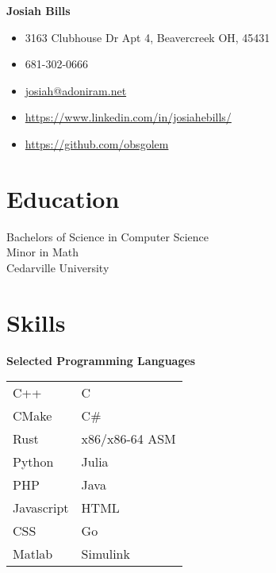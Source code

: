 \documentclass[10pt]{article}
\begin{document}
\begin{paracol}{2}
    \parbox[top][0.08\textheight][c]{\linewidth}{
        \textbf{\Huge{Josiah Bills}}
    }

    \switchcolumn

    \parbox[top][0.08\textheight][c]{\linewidth}{
        \begin{mdframed}[hidealllines=true,backgroundcolor=gray!20]
            \begin{itemize}[noitemsep]
                \item[] 3163 Clubhouse Dr Apt 4, Beavercreek OH, 45431
                \item[] 681-302-0666
                \item[] \href{mailto://Josiah@adoniram.net}{josiah@adoniram.net}
                \item[] \url{https://www.linkedin.com/in/josiahebills/}
                \item[] \url{https://github.com/obsgolem}
            \end{itemize}
        \end{mdframed}
    }

    \switchcolumn

    \section*{Education}
    \parbox[top][][c]{\linewidth}{
        Bachelors of Science in Computer Science \\
        Minor in Math \\
        Cedarville University
    }

    \section*{Skills}

    \parbox[top][][c]{\linewidth}{
        \begin{center}
            \textbf{Selected Programming Languages}
        \end{center}
        \begin{tabularx}{\linewidth}{YY}
            C++        & C              \\
            CMake      & C\#            \\
            Rust       & x86/x86-64 ASM \\
            Python     & Julia          \\
            PHP        & Java           \\
            Javascript & HTML           \\
            CSS        & Go             \\
            Matlab     & Simulink
        \end{tabularx}

}
\end{paracol}
\end{document}
